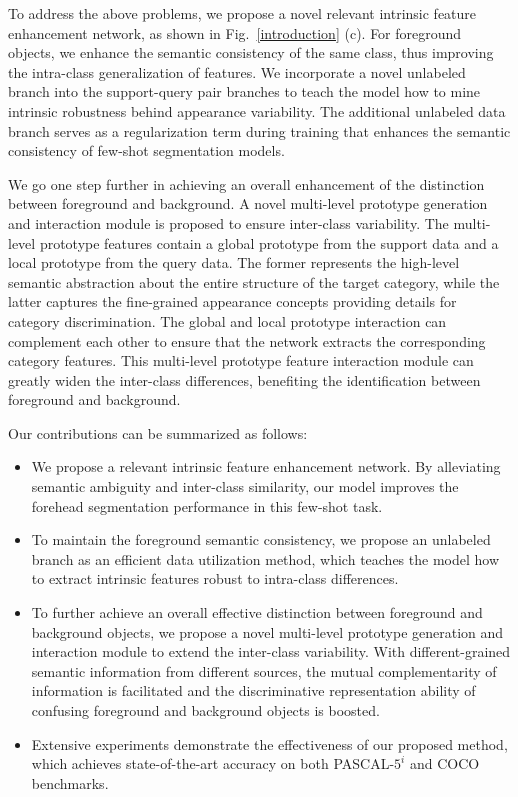 \documentclass[letterpaper]{article} %
\begin{document}
To address the above problems, we propose a novel relevant intrinsic feature enhancement network, as shown in Fig.~\ref{introduction} (c). For foreground objects, we enhance the semantic consistency of the same class, thus improving the intra-class generalization of features. We incorporate a novel unlabeled branch into the support-query pair branches to teach the model how to mine intrinsic robustness behind appearance variability. The additional unlabeled data branch serves as a regularization term during training that enhances the semantic consistency of few-shot segmentation models.

We go one step further in achieving an overall enhancement of the distinction between foreground and background. A novel multi-level prototype generation and interaction module is proposed to ensure inter-class variability. The multi-level prototype features contain a global prototype from the support data and a local prototype from the query data. The former represents the high-level semantic abstraction about the entire structure of the target category, while the latter captures the fine-grained appearance concepts providing details for category discrimination. The global and local prototype interaction can complement each other to ensure that the network extracts the corresponding category features. This multi-level prototype feature interaction module can greatly widen the inter-class differences, benefiting the identification between foreground and background.

Our contributions can be summarized as follows:
\begin{itemize}
   \item We propose a relevant intrinsic feature enhancement network. By alleviating semantic ambiguity and inter-class similarity, our model improves the forehead segmentation performance in this few-shot task.
   \item To maintain the foreground semantic consistency, we propose an unlabeled branch as an efficient data utilization method, which teaches the model how to extract intrinsic features robust to intra-class differences.
   \item To further achieve an overall effective distinction between foreground and background objects, we propose a novel multi-level prototype generation and interaction module to extend the inter-class variability. With different-grained semantic information from different sources, the mutual complementarity of information is facilitated and the discriminative representation ability of confusing foreground and background objects is boosted.
   \item Extensive experiments demonstrate the effectiveness of our proposed method, which achieves state-of-the-art accuracy on both PASCAL-$5^i$ and COCO benchmarks.
\end{itemize}
\end{document}

